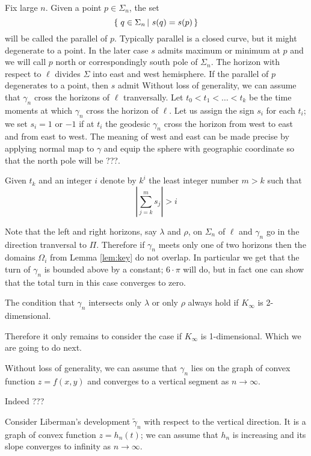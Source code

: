 \documentclass[a4paper,10pt]{amsart}
\begin{document}
Fix large $n$.
Given a point $p\in \Sigma_n$,
the set 
\[\set{q\in\Sigma_n}{s(q)=s(p)}\]
will be called the parallel of $p$.
Typically parallel is a closed curve,
but it might degenerate to a point.
In the later case $s$ admits maximum or minimum at $p$
and we will call $p$ north or correspondingly south pole of $\Sigma_n$.
The horizon with respect to $\ell$ divides $\Sigma$ into east and west hemisphere.
If the parallel of $p$ degenerates to a point, 
then $s$ admit
Without loss of generality, we can assume that $\gamma_n$ 
cross the horizons of $\ell$ tranversally.
Let $t_0<t_1<\dots<t_k$ be the time moments 
at which $\gamma_n$ cross the horizon of $\ell$.
Let us assign the sign $s_i$ for each $t_i$;
we set $s_i=1$ or $-1$ 
if at $t_i$ the geodesic $\gamma_n$ cross the horizon from west to east and
from east to west.
The meaning of west and east can be made precise by applying normal map to $\gamma$ and equip the sphere with geographic coordinate so that the north pole will be ???. 

Given $t_k$ and an integer 
$i$ denote by $k^i$ the least integer number $m>k$ such that
\[|\sum_{j=k}^m s_j|>i\]




Note that the left and right horizons, 
say $\lambda$ and $\rho$,
on $\Sigma_n$ of $\ell$
and $\gamma_n$ go in the direction tranversal to $\Pi$.
Therefore if $\gamma_n$ meets only one of two horizons
then the domains $\Omega_i$ from Lemma \ref{lem:key}
do not overlap.
In particular we get that the turn of $\gamma_n$ is bounded above by a constant;
$6\cdot\pi$ will do, but in fact one can show that the total turn in this case converges to zero. 

The condition that $\gamma_n$ intersects only $\lambda$ or only $\rho$ always hold if $K_\infty$ is 2-dimensional.

Therefore it only remains to consider the case if $K_\infty$ is 1-dimensional.
Which we are going to do next.

Without loss of generality, we can assume that $\gamma_n$ lies on the graph of convex function $z=f(x,y)$ and converges to a vertical segment as $n\to \infty$.

\medskip

Indeed ???

Consider Liberman's development $\tilde\gamma_n$ with respect to the vertical direction.
It is a graph of convex function $z=h_n(t)$;
we can assume that $h_n$ is increasing and its slope converges to infinity as $n\to\infty$.
\end{document}
